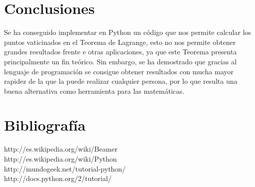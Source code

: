\documentclass{beamer}
\begin{document}
\section{Conclusiones}
\begin{frame}
    Se ha conseguido implementar en Python un código que nos permite calcular los puntos vaticinados en el Teorema de Lagrange, esto no nos permite obtener grandes resultados frente e otras aplicaciones, ya que este Teorema presenta principalmente un fin teórico.
    Sin embargo, se ha demostrado que gracias al lenguaje de programación se consigue obtener resultados con mucha mayor rapidez de la que la puede realizar cualquier persona, por lo que resulta una buena alternativa como herramienta para las matemáticas.
\end{frame}

\section{Bibliografía}
  \begin{frame}
    http://es.wikipedia.org/wiki/Beamer\\http://es.wikipedia.org/wiki/Python\\http://mundogeek.net/tutorial-python/\\http://docs.python.org/2/tutorial/
    \end{frame}
\end{document}
